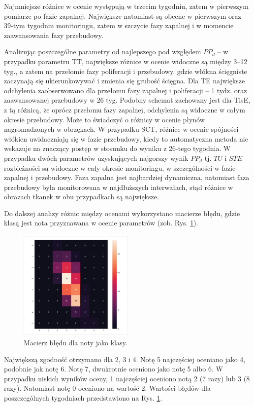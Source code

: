 Najmniejsze różnice w ocenie występują w trzecim tygodniu, zatem w pierwszym pomiarze po fazie zapalnej. Największe natomiast są obecne w pierwszym oraz 39-tym tygodniu monitoringu, zatem w szczycie fazy zapalnej i w momencie zaawansowania fazy przebudowy. 

Analizując poszczególne parametry od najlepszego pod względem $PP_d$ -- w przypadku parametru TT, największe różnice w ocenie widoczne są między 3--12 tyg., a zatem na przełomie fazy poliferacji i przebudowy, gdzie włókna ścięgniste zaczynają się ukierunkowywać i zmienia się grubość ścięgna. Dla TE największe odchylenia zaobserwowano dla przełomu fazy zapalnej i poliferacji -- 1 tydz. oraz zaawansowanej przebudowy w 26 tyg. Podobny schemat zachowany jest dla TisE, z tą różnicą, że oprócz przełomu fazy zapalnej, odchylenia są widoczne w całym okresie przebudowy. Może to świadczyć o różnicy w ocenie płynów nagromadzonych w obrzękach. W przypadku SCT, różnice w ocenie spójności włókien uwidaczniają się w fazie przebudowy, kiedy to automatyczna metoda nie wskazuje na znaczący postęp w stosunku do wyniku z 26-tego tygodnia. W przypadku dwóch parametrów uzyskujących najgorszy wynik $PP_d$ tj. $TU$ i $STE$ rozbieżności są widoczne w cały okresie monitoringu, w szczególności w fazie zapalnej i przebudowy. Faza zapalna jest najbardziej dynamiczna, natomiast faza przebudowy była monitorowana w najdłuższych interwałach, stąd różnice w obrazach tkanek w obu przypadkach są największe. 

Do dalszej analizy różnic między ocenami wykorzystano macierze błędu, gdzie klasą jest nota przyznawana w ocenie parametrów (zob. Rys. \ref{fig:cmscores}).
\begin{figure}[]
	\centering
	\includegraphics[width=0.5\textwidth]{figures/cmScores.jpg}
	\caption{Macierz błędu dla noty jako klasy.}\label{fig:cmscores}
\end{figure}
Największą zgodność otrzymano dla 2, 3 i 4. Notę 5 najczęściej oceniano jako 4, podobnie jak notę 6. Notę 7, dwukrotnie oceniono jako notę 5 albo 6. W przypadku niskich wyników oceny, 1 najczęściej oceniono notą 2 (7 razy) lub 3 (8 razy). Natomiast notę 0 oceniono na wartość 2. Wartości błędów dla poszczególnych tygodniach przedstawiono na Rys. \ref{fig:cmscores}.

